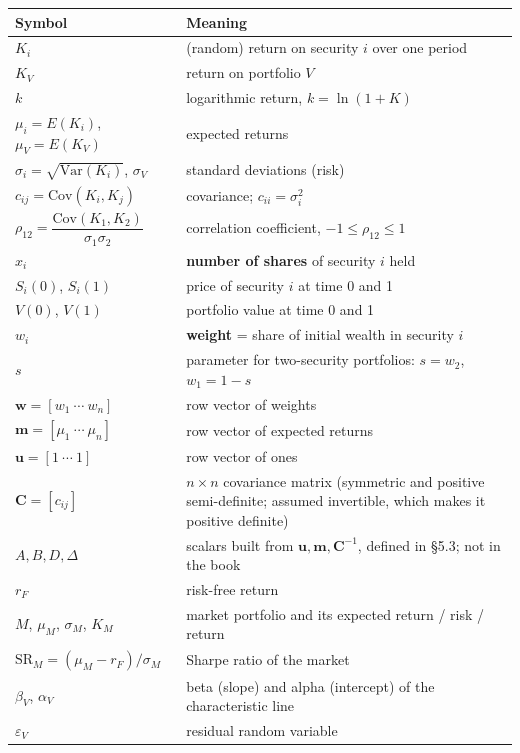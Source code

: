 \documentclass[titlepage,11pt,a4paper]{article}
\newcommand{\Var}{\mathrm{Var}}
\newcommand{\Cov}{\mathrm{Cov}}
\newcommand{\E}{E}
\newcommand{\vw}{\boldsymbol{w}}
\newcommand{\vm}{\boldsymbol{m}}
\newcommand{\vu}{\boldsymbol{u}}
\newcommand{\vC}{\boldsymbol{C}}
\newcommand{\Ci}{\vC^{-1}}
\newcommand{\SR}{\mathrm{SR}}
\begin{document}
\begin{center}\small\renewcommand{\arraystretch}{1.35}
\begin{tabular}{@{}>{\raggedright\arraybackslash}p{} p{}@{}}
\toprule
\textbf{\color{mycyan}Symbol} & \textbf{\color{mycyan}Meaning}\\
\midrule
$K_i$ & (random) return on security $i$ over one period\\
$K_V$ & return on portfolio $V$\\
$k$ & logarithmic return, $k=\ln(1+K)$\\
$\mu_i=\E(K_i)$, $\mu_V=\E(K_V)$ & expected returns\\
$\sigma_i=\sqrt{\Var(K_i)}$, $\sigma_V$ & standard deviations (risk)\\
$c_{ij}=\Cov(K_i,K_j)$ & covariance; $c_{ii}=\sigma_i^2$\\
$\rho_{12}=\dfrac{\Cov(K_1,K_2)}{\sigma_1\sigma_2}$ & correlation coefficient, $-1\le\rho_{12}\le1$\\
$x_i$ & \textbf{number of shares} of security $i$ held\\
$S_i(0)$, $S_i(1)$ & price of security $i$ at time 0 and 1\\
$V(0)$, $V(1)$ & portfolio value at time 0 and 1\\
$w_i$ & \textbf{weight} = share of initial wealth in security $i$\\
$s$ & parameter for two-security portfolios: $s=w_2$, $w_1=1-s$\\
$\vw=[w_1\ \cdots\ w_n]$ & row vector of weights\\
$\vm=[\mu_1\ \cdots\ \mu_n]$ & row vector of expected returns\\
$\vu=[1\ \cdots\ 1]$ & row vector of ones\\
$\vC=[c_{ij}]$ & $n\times n$ covariance matrix (symmetric and positive semi-definite; assumed invertible, which makes it positive definite)\\
$A,B,D,\Delta$ & scalars built from $\vu,\vm,\Ci$, defined in \S5.3; not in the book\\
$r_F$ & risk-free return\\
$M$, $\mu_M$, $\sigma_M$, $K_M$ & market portfolio and its expected return / risk / return\\
$\SR_M=(\mu_M-r_F)/\sigma_M$ & Sharpe ratio of the market\\
$\beta_V$, $\alpha_V$ & beta (slope) and alpha (intercept) of the characteristic line\\
$\varepsilon_V$ & residual random variable\\
\bottomrule
\end{tabular}
\end{center}
\end{document}
